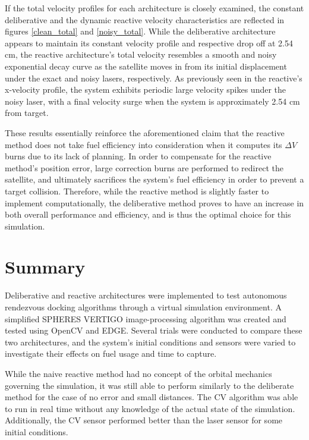 \documentclass[journal, 10pt]{IEEEtran}
\begin{document}
If the total velocity profiles for each architecture is closely examined, the constant deliberative and the dynamic reactive velocity characteristics are reflected in figures \ref{clean_total} and \ref{noisy_total}. While the deliberative architecture appears to maintain its constant velocity profile and respective drop off at 2.54 cm, the reactive architecture's total velocity resembles a smooth and noisy exponential decay curve as the satellite moves in from its initial displacement under the exact and noisy lasers, respectively. As previously seen in the reactive's x-velocity profile, the system exhibits periodic large velocity spikes under the noisy laser, with a final velocity surge when the system is approximately 2.54 cm from target.

These results essentially reinforce the aforementioned claim that the reactive method does not take fuel efficiency into consideration when it computes its $\Delta V$  burns due to its lack of planning. In order to compensate for the reactive method's position error, large correction burns are performed to redirect the satellite, and ultimately sacrifices the system's fuel efficiency in order to prevent a target collision. Therefore, while the reactive method is slightly faster to implement computationally, the deliberative method proves to have an increase in both overall performance and efficiency, and is thus the optimal choice for this simulation.

\section{Summary}
Deliberative and reactive architectures were implemented to test autonomous rendezvous docking algorithms through a virtual simulation environment. A simplified SPHERES VERTIGO image-processing algorithm was created and tested using OpenCV and EDGE. Several trials were conducted to compare these two architectures, and the system's initial conditions and sensors were varied to investigate their effects on fuel usage and time to capture.

While the naive reactive method had no concept of the orbital mechanics governing the simulation, it was still able to perform similarly to the deliberate method for the case of no error and small distances. The CV algorithm was able to run in real time without any knowledge of the actual state of the simulation. Additionally, the CV sensor performed better than the laser sensor for some initial conditions.
\end{document}
